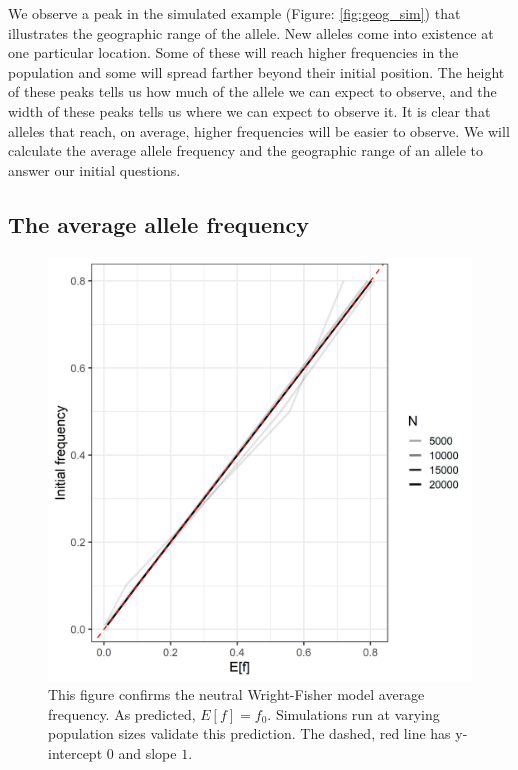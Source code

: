 We observe a peak in the simulated example (Figure: \ref{fig:geog_sim}) that illustrates the geographic range of the allele. New alleles come into existence at one particular location. Some of these will reach higher frequencies in the population and some will spread farther beyond their initial position. The height of these peaks tells us how much of the allele we can expect to observe, and the width of these peaks tells us where we can expect to observe it. It is clear that alleles that reach, on average, higher frequencies will be easier to observe. We will calculate the average allele frequency and the geographic range of an allele to answer our initial questions.



\subsection{The average allele frequency}





\begin{figure}[h]
    \centering
    \includegraphics[scale=0.5]{img/mean_f.jpg}
    \caption{This figure confirms the neutral Wright-Fisher model average frequency. As predicted, $E[f] = f_0$. Simulations run at varying population sizes validate this prediction. The dashed, red line has y-intercept $0$ and slope $1$.}
    \label{fig:mean_wf}
\end{figure}



